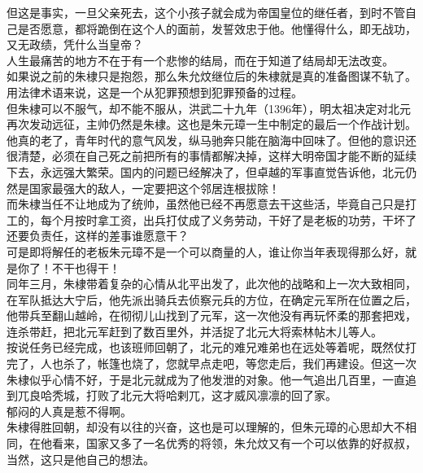 \begin{multicols}{\theparacolNo}
但这是事实，一旦父亲死去，这个小孩子就会成为帝国皇位的继任者，到时不管自己是否愿意，都将跪倒在这个人的面前，发誓效忠于他。他懂得什么，即无战功，又无政绩，凭什么当皇帝？\\

人生最痛苦的地方不在于有一个悲惨的结局，而在于知道了结局却无法改变。\\

如果说之前的朱棣只是抱怨，那么朱允炆继位后的朱棣就是真的准备图谋不轨了。用法律术语来说，这是一个从犯罪预想到犯罪预备的过程。\\

但朱棣可以不服气，却不能不服从，洪武二十九年（1396年），明太祖决定对北元再次发动远征，主帅仍然是朱棣。这也是朱元璋一生中制定的最后一个作战计划。\\

他真的老了，青年时代的意气风发，纵马驰奔只能在脑海中回味了。但他的意识还很清楚，必须在自己死之前把所有的事情都解决掉，这样大明帝国才能不断的延续下去，永远强大繁荣。国内的问题已经解决了，但卓越的军事直觉告诉他，北元仍然是国家最强大的敌人，一定要把这个邻居连根拔除！\\

而朱棣当任不让地成为了统帅，虽然他已经不再愿意去干这些活，毕竟自己只是打工的，每个月按时拿工资，出兵打仗成了义务劳动，干好了是老板的功劳，干坏了还要负责任，这样的差事谁愿意干？\\

可是即将解任的老板朱元璋不是一个可以商量的人，谁让你当年表现得那么好，就是你了！不干也得干！\\

同年三月，朱棣带着复杂的心情从北平出发了，此次他的战略和上一次大致相同，在军队抵达大宁后，他先派出骑兵去侦察元兵的方位，在确定元军所在位置之后，他带兵至翻山越岭，在彻彻儿山找到了元军，这一次他没有再玩怀柔的那套把戏，连杀带赶，把北元军赶到了数百里外，并活捉了北元大将索林帖木儿等人。\\

按说任务已经完成，也该班师回朝了，北元的难兄难弟也在远处等着呢，既然仗打完了，人也杀了，帐篷也烧了，您就早点走吧，等您走后，我们再建设。但这一次朱棣似乎心情不好，于是北元就成为了他发泄的对象。他一气追出几百里，一直追到兀良哈秃城，打败了北元大将哈剌兀，这才威风凛凛的回了家。\\

郁闷的人真是惹不得啊。\\

朱棣得胜回朝，却没有以往的兴奋，这也是可以理解的，但朱元璋的心思却大不相同，在他看来，国家又多了一名优秀的将领，朱允炆又有一个可以依靠的好叔叔，当然，这只是他自己的想法。\\


\end{multicols}
